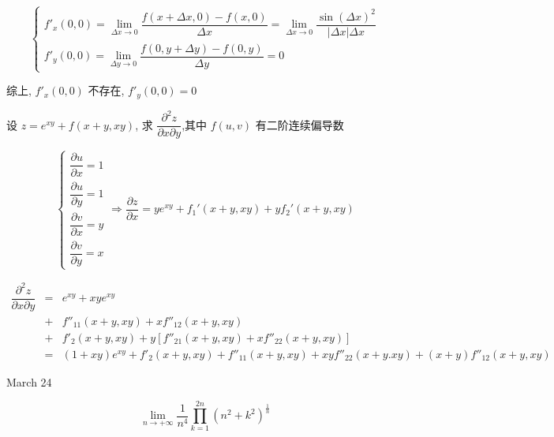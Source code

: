 \begin{solution}
	
	$$\begin{cases}
	  f'_{x}(0,0) = \lim\limits_{\Delta x \to 0} \dfrac{f(x+\Delta x,0)-f(x,0)}{\Delta x} = 
	  \lim\limits_{\Delta x \to 0} \dfrac{\sin (\Delta x)^2}{\big|\Delta x\big|\Delta x}\\
	  f'_{y}(0,0) = \lim\limits_{\Delta y \to 0} \dfrac{f(0,y+\Delta y)-f(0,y)}{\Delta y} = 0
	\end{cases}$$
	
	综上, $f'_{x}(0,0)$ 不存在, $f'_{y}(0,0)=0$
\end{solution}

\begin{example}[][Exam: 29.4.4]
	设 $z=e^{xy}+f(x+y,xy)$, 求 $\dfrac{\partial^2 z}{\partial x\partial y}$,其中 $f(u,v)$ 有二阶连续偏导数
\end{example}

\begin{solution}
	
	$$\begin{cases}
	  \dfrac{\partial u}{\partial x} = 1\\
	  \dfrac{\partial u}{\partial y} = 1\\
	  \dfrac{\partial v}{\partial x} = y\\
	  \dfrac{\partial v}{\partial y} = x
	\end{cases}\Rightarrow \dfrac{\partial z}{\partial x} = ye^{xy} + f_{1}'(x+y,xy) + yf_{2}'(x+y,xy)$$
	
	\begin{eqnarray*}
		\dfrac{\partial^{2} z}{\partial x\partial y} & = & e^{xy} + xye^{xy} \\
		& + & f''_{11}(x+y,xy) + xf''_{12}(x+y,xy)\\
		& + & f'_{2}(x+y,xy) + y\left[f''_{21}(x+y,xy) + xf''_{22}(x+y,xy)\right]\\
		& = & (1+xy)e^{xy} + f'_{2}(x+y,xy) + f''_{11}(x+y,xy) + xyf''_{22}(x+y.xy) + (x+y)f''_{12}(x+y,xy)
	\end{eqnarray*}
\end{solution}

\textcolor{purplea}{March 24}

\begin{example}[][Exam: 29.4.5]
	$$\lim\limits_{n\to +\infty}\dfrac{1}{n^4}\prod\limits_{k=1}^{2n}(n^2+k^2)^{\frac{1}{n}}$$
\end{example}

